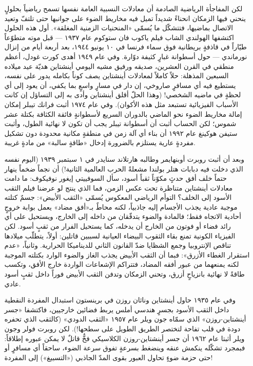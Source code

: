 \documentclass[12pt,a4paper,openany]{book}
\begin{document}
لكن المفاجأة الرياضية الصادمة أن معادلات النسبية العامة نفسها تسمح رياضياً بحلولٍ ينحني فيها الزمكان انحناءً شديداً تميل فيه مخاريط الضوء على جوانبها حتى تلتفّ وتعيد الاتصال بماضيها، فتتشكّل ما يُسمّى «المنحنيات الزمنية المغلقة». أول هذه الحلول اكتشفها الهولندي الشاب فيلم ياكوب فان ستوكوم عام ١٩٣٧ — قبل موته متطوّعاً طيّاراً في قاذفةٍ بريطانية فوق سماء فرنسا في ١٠ يونيو ١٩٤٤، بعد أربعة أيام من إنزال نورماندي — حول أسطوانة غبارٍ كثيفة دوّارة. وفي عام ١٩٤٩ أهدى كورت غودل، أعظم منطقي في القرن العشرين، صديقه ورفيق مشيه اليومي أينشتاين هديّة عيد ميلاده السبعين المذهلة: حلاً كاملاً لمعادلات أينشتاين يصف كوناً بكامله يدور على نفسه، يستطيع فيه أي مسافرٍ صاروخي، إن دار في مسارٍ واسعٍ بما يكفي، أن يعود إلى أي لحظةٍ في ماضيه الشخصي! (وهذا الحلّ أقلق أينشتاين وأدى به إلى التساؤل إن كانت الأسباب الفيزيائية تستبعد مثل هذه الأكوان). وفي عام ١٩٧٤ أثبت فرانك تيبلر إمكان إمالة مخاريط الضوء نحو الماضي بالدوران السريع لأسطوانةٍ فائقة الكثافة بكتلة عشر شموس؛ لكن الحساب أثبت أن أسطوانة تيبلر يجب أن تكون لا نهائية الطول، وأثبت ستيفن هوكينغ عام ١٩٩٢ أن بناء أي آلة زمن في منطقةٍ مكانية محدودة دون تشكيل مفردةٍ عارية يستلزم بالضرورة إدخال «طاقةٍ سالبة» من مادةٍ غريبة.


وبعد أن أثبت روبرت أوبنهايمر وطالبه هارتلاند سنايدر في ١ سبتمبر ١٩٣٩ (اليوم نفسه الذي دخلت فيه دبابات هتلر بولندا مشعلةً الحرب العالمية الثانية!) أن نجماً ضخماً ينهار حتماً خلف أفق حدثٍ مكوّناً ثقباً أسود، سأل السوفييتي إيغور نوفيكوف: ما دامت معادلات أينشتاين متناظرة تحت عكس الزمن، فما الذي ينتج لو عرضنا فيلم الثقب الأسود إلى الخلف؟ التوأم الرياضي المعكوس يُسمّى «الثقب الأبيض»: جسمٌ كتلته موجبة عادية يجذب الأجسام إليه جاذبياً، لكنه محاطٌ بـ«أفق مضاد» يعمل بوابة خروجٍ أحادية الاتجاه فقط؛ فالمادة والضوء يتدفّقان من داخله إلى الخارج، ويستحيل على أي رائد فضاء أو فوتون من الخارج أن يدخله، كما يستحيل الفرار من ثقبٍ أسود. لكن الفيزياء الكونية تمنع بقاء الثقوب البيضاء العيانية لسببين قاتلين: أولاً، يتطلّب ميلادها تناقص الإنتروبيا وجمع الشظايا ضدّ القانون الثاني للديناميكا الحرارية. وثانياً، «عدم استقرار الغطاء الأزرق»: فبما أن الثقب الأبيض يجذب الغاز والضوء الوارد بكتلته الموجبة لكنه يمنعهما من عبور أفقه المضاد، فتتراكم الإشعاعات الواردة خارج الأفق، وتكسب طاقةً لا نهائية بانزياحٍ أزرق، وتحني الزمكان وتدفن الثقب الأبيض فوراً داخل ثقبٍ أسود عادي.


وفي عام ١٩٣٥ حاول أينشتاين وناثان روزن في برينستون استبدال المفردة النقطية داخل الثقب الأسود بجسرٍ هندسي أملس يربط فضائين خارجيين، فاكتشفا «جسر أينشتاين-روزن» الذي سمّاه جون ويلر عام ١٩٥٧ «الثقب الدودي» (كالثقب الذي تحفره دودة في قلب تفاحة لتختصر الطريق الطويل على سطحها!). لكن روبرت فولر وجون ويلر أثبتا عام ١٩٦٢ أن جسر أينشتاين-روزن الكلاسيكي فخٌّ قاتلٌ لا يمكن عبوره إطلاقاً: فبمجرد تشكّله ينكمش عنقه وينضغط بسرعةٍ تفوق سرعة الضوء، ساحقاً أي مسافرٍ أو حتى حزمة ضوءٍ تحاول العبور بقوى المدّ الجاذبي («التسبيغ») إلى المفردة!
\end{document}
